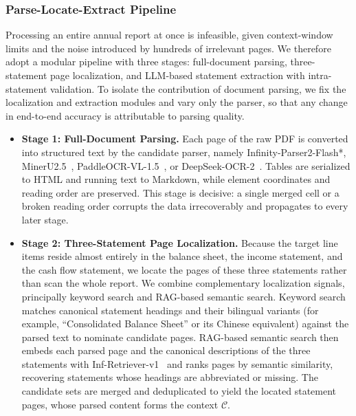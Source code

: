 \subsubsection*{Parse-Locate-Extract Pipeline}
Processing an entire annual report at once is infeasible, given context-window limits and the noise introduced by hundreds of irrelevant pages. We therefore adopt a modular pipeline with three stages: full-document parsing, three-statement page localization, and LLM-based statement extraction with intra-statement validation. To isolate the contribution of document parsing, we fix the localization and extraction modules and vary only the parser, so that any change in end-to-end accuracy is attributable to parsing quality.

\begin{itemize}[
  leftmargin=1.0em,
  labelsep=0.5em
]
    \item \textbf{Stage 1: Full-Document Parsing.} Each page of the raw PDF is converted into structured text by the candidate parser, namely Infinity-Parser2-Flash*, MinerU2.5~\cite{niu2025mineru2}, PaddleOCR-VL-1.5~\cite{cui2025paddleocr}, or DeepSeek-OCR-2~\cite{wei2026deepseek2}. Tables are serialized to HTML and running text to Markdown, while element coordinates and reading order are preserved. This stage is decisive: a single merged cell or a broken reading order corrupts the data irrecoverably and propagates to every later stage.

    \item \textbf{Stage 2: Three-Statement Page Localization.} Because the target line items reside almost entirely in the balance sheet, the income statement, and the cash flow statement, we locate the pages of these three statements rather than scan the whole report. We combine complementary localization signals, principally keyword search and RAG-based semantic search. Keyword search matches canonical statement headings and their bilingual variants (for example, ``Consolidated Balance Sheet'' or its Chinese equivalent) against the parsed text to nominate candidate pages. RAG-based semantic search then embeds each parsed page and the canonical descriptions of the three statements with Inf-Retriever-v1~\cite{infly-ai_2025} and ranks pages by semantic similarity, recovering statements whose headings are abbreviated or missing. The candidate sets are merged and deduplicated to yield the located statement pages, whose parsed content forms the context $\mathcal{C}$.


\end{itemize}
